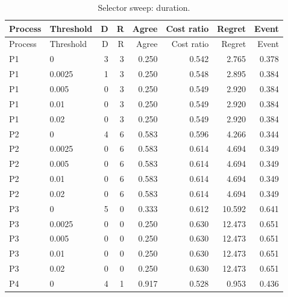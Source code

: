 \begingroup\small\setlength{\tabcolsep}{3pt}\begin{longtable}{llrrrrrr}\caption{Selector sweep: duration.}\\\toprule

Process & Threshold & D & R & Agree & Cost ratio & Regret & Event\\\midrule\endfirsthead

\toprule Process & Threshold & D & R & Agree & Cost ratio & Regret & Event\\\midrule\endhead

P1 & 0 & 3 & 3 & 0.250 & 0.542 & 2.765 & 0.378\\

P1 & 0.0025 & 1 & 3 & 0.250 & 0.548 & 2.895 & 0.384\\

P1 & 0.005 & 0 & 3 & 0.250 & 0.549 & 2.920 & 0.384\\

P1 & 0.01 & 0 & 3 & 0.250 & 0.549 & 2.920 & 0.384\\

P1 & 0.02 & 0 & 3 & 0.250 & 0.549 & 2.920 & 0.384\\

P2 & 0 & 4 & 6 & 0.583 & 0.596 & 4.266 & 0.344\\

P2 & 0.0025 & 0 & 6 & 0.583 & 0.614 & 4.694 & 0.349\\

P2 & 0.005 & 0 & 6 & 0.583 & 0.614 & 4.694 & 0.349\\

P2 & 0.01 & 0 & 6 & 0.583 & 0.614 & 4.694 & 0.349\\

P2 & 0.02 & 0 & 6 & 0.583 & 0.614 & 4.694 & 0.349\\

P3 & 0 & 5 & 0 & 0.333 & 0.612 & 10.592 & 0.641\\

P3 & 0.0025 & 0 & 0 & 0.250 & 0.630 & 12.473 & 0.651\\

P3 & 0.005 & 0 & 0 & 0.250 & 0.630 & 12.473 & 0.651\\

P3 & 0.01 & 0 & 0 & 0.250 & 0.630 & 12.473 & 0.651\\

P3 & 0.02 & 0 & 0 & 0.250 & 0.630 & 12.473 & 0.651\\

P4 & 0 & 4 & 1 & 0.917 & 0.528 & 0.953 & 0.436\\


\end{longtable}
